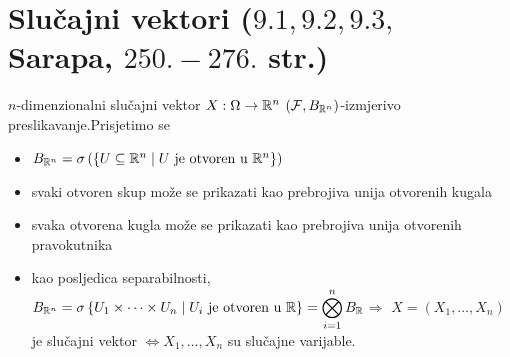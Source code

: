 \documentclass{article}
\begin{document}
\section{Slučajni vektori (\textsection \(9.1,9.2,9.3,\) Sarapa, \(250.-276.\) str.)}
\(n\)-dimenzionalni slučajni vektor \(X:\Omega\to\Bbb R^n\) \(\left(\mathcal F, B_{\Bbb R^n}\right)\)-izmjerivo preslikavanje.\newline Prisjetimo se \begin{itemize}
    \item[\ding{113}] \(B_{\Bbb R^n}=\sigma\left(\left\{U\subseteq\Bbb R^n\mid U\text{ je otvoren u }\Bbb R^n\right\}\right)\)
    \item[\ding{113}] svaki otvoren skup može se prikazati kao prebrojiva unija otvorenih kugala
    \item[\ding{113}] svaka otvorena kugla može se prikazati kao prebrojiva unija otvorenih pravokutnika
    \item[\ding{113}] kao posljedica separabilnosti, \(\displaystyle B_{\Bbb R^n}=\sigma\left\{U_1\times\cdots\times U_n\mid U_i\text{ je otvoren u }\Bbb R\right\}=\bigotimes_{i=1}^n B_\Bbb R\)\newline \(\Rightarrow\) \(X=(X_1,\ldots,X_n)\) je slučajni vektor \(\Leftrightarrow X_1,\ldots, X_n\) su slučajne varijable.
\end{itemize} 
\end{document}

